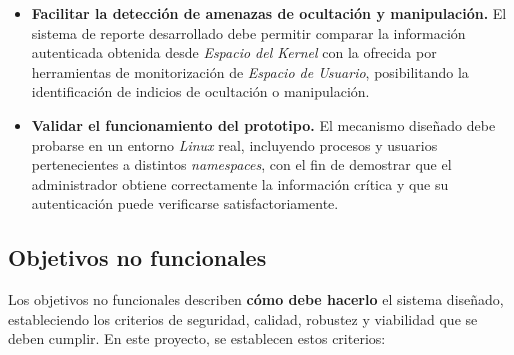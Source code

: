 \begin{itemize}
    \item \textbf{Facilitar la detección de amenazas de ocultación y manipulación.} El sistema de reporte desarrollado debe permitir comparar la información autenticada obtenida desde \textit{Espacio del Kernel} con la ofrecida por herramientas de monitorización de \textit{Espacio de Usuario}, posibilitando la identificación de indicios de ocultación o manipulación.
    \item \textbf{Validar el funcionamiento del prototipo.} El mecanismo diseñado debe probarse en un entorno \textit{Linux} real, incluyendo procesos y usuarios pertenecientes a distintos \textit{namespaces}, con el fin de demostrar que el administrador obtiene correctamente la información crítica y que su autenticación puede verificarse satisfactoriamente.
\end{itemize}

\subsection{Objetivos no funcionales}
\label{sec:onf}

Los objetivos no funcionales describen \textbf{cómo debe hacerlo} el sistema diseñado, estableciendo los criterios de seguridad, calidad, robustez y viabilidad que se deben cumplir.
En este proyecto, se establecen estos criterios:


